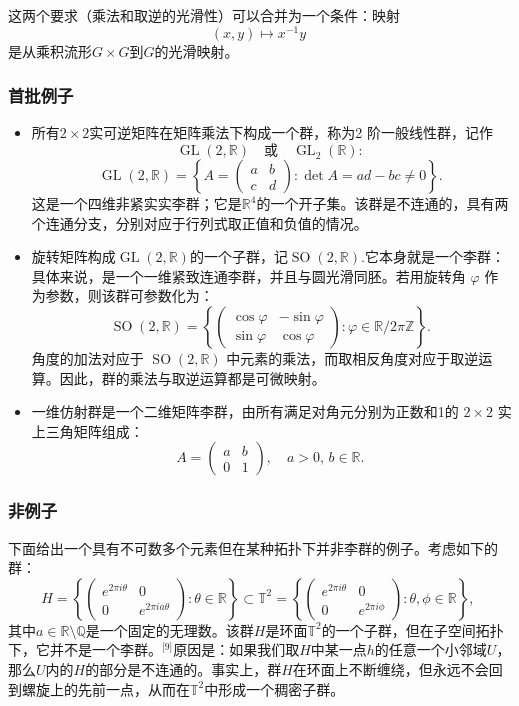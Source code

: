 这两个要求（乘法和取逆的光滑性）可以合并为一个条件：映射
$$
(x,y) \mapsto x^{-1}y~
$$
是从乘积流形$G \times G$到$G$的光滑映射。
\subsubsection{首批例子}
\begin{itemize}
\item 所有$2 \times 2$实可逆矩阵在矩阵乘法下构成一个群，称为2 阶一般线性群，记作
$$
\operatorname{GL}(2,\mathbb{R}) \quad \text{或} \quad \operatorname{GL}_{2}(\mathbb{R}) :~
$$
$$
\operatorname{GL}(2,\mathbb{R})=\left\{A=\begin{pmatrix}a & b \\ c & d\end{pmatrix} : \det A = ad - bc \neq 0 \right\}.~
$$
这是一个四维非紧实实李群；它是$\mathbb{R}^4$的一个开子集。该群是不连通的，具有两个连通分支，分别对应于行列式取正值和负值的情况。
\item 旋转矩阵构成$\operatorname{GL}(2,\mathbb{R})$的一个子群，记$\operatorname{SO}(2,\mathbb{R})$.它本身就是一个李群：具体来说，是一个一维紧致连通李群，并且与圆光滑同胚。若用旋转角 $\varphi$ 作为参数，则该群可参数化为：
$$
\operatorname{SO}(2,\mathbb{R})=\left\{\begin{pmatrix}\cos \varphi & -\sin \varphi \\ \sin \varphi & \cos \varphi \end{pmatrix} : \varphi \in \mathbb{R} / 2\pi\mathbb{Z}\right\}.~
$$
角度的加法对应于 $\operatorname{SO}(2,\mathbb{R})$ 中元素的乘法，而取相反角度对应于取逆运算。因此，群的乘法与取逆运算都是可微映射。
\item 一维仿射群是一个二维矩阵李群，由所有满足对角元分别为正数和1的 $2 \times 2$ 实上三角矩阵组成：
$$
A=\begin{pmatrix} a & b \\ 0 & 1 \end{pmatrix}, \quad a > 0, \, b \in \mathbb{R}.~
$$
\end{itemize}
\subsubsection{非例子}
下面给出一个具有不可数多个元素但在某种拓扑下并非李群的例子。考虑如下的群：
$$
H = \left\{\begin{pmatrix} e^{2\pi i \theta} & 0 \\ 0 & e^{2\pi i a \theta} \end{pmatrix} : \theta \in \mathbb{R} \right\} 
\subset 
\mathbb{T}^2 = \left\{\begin{pmatrix} e^{2\pi i \theta} & 0 \\ 0 & e^{2\pi i \phi} \end{pmatrix} : \theta, \phi \in \mathbb{R} \right\},~
$$
其中$a \in \mathbb{R} \setminus \mathbb{Q}$是一个固定的无理数。该群$H$是环面$\mathbb{T}^2$的一个子群，但在子空间拓扑下，它并不是一个李群。\(^\text{[9]}\)原因是：如果我们取$H$中某一点$h$的任意一个小邻域$U$，那么$U$内的$H$的部分是不连通的。事实上，群$H$在环面上不断缠绕，但永远不会回到螺旋上的先前一点，从而在$\mathbb{T}^2$中形成一个稠密子群。

